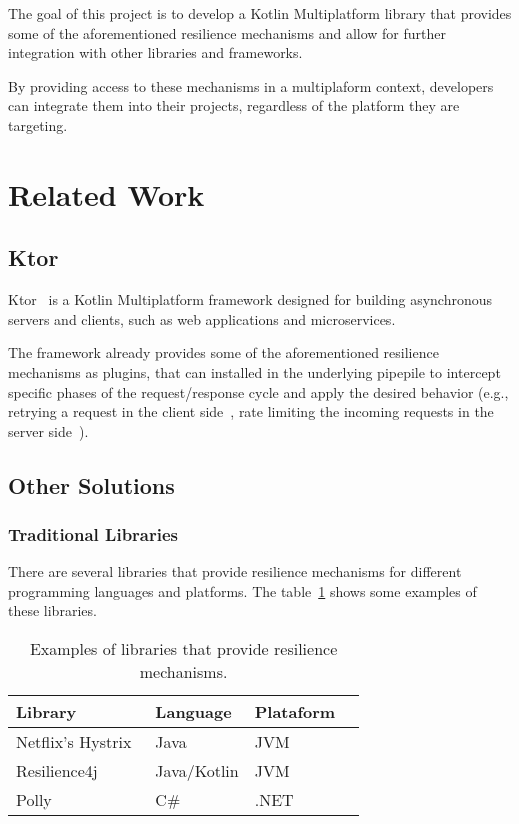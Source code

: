 The goal of this project is to develop a Kotlin Multiplatform library that provides some of the aforementioned resilience mechanisms and allow for further integration with other libraries and frameworks.

By providing access to these mechanisms in a multiplaform context, developers can integrate them into their projects, regardless of the platform they are targeting.


\section{Related Work}\label{sec:related-work}

\subsection{Ktor}\label{subsec:ktor}
Ktor~\cite{ktor} is a Kotlin Multiplatform framework designed for building asynchronous servers and clients, such as web applications and microservices.

The framework already provides some of the aforementioned resilience mechanisms as plugins, that can installed in the underlying pipepile to intercept specific phases of the request/response cycle and apply the desired behavior (e.g., retrying a request in the client side~\cite{ktor-client-retry}, rate limiting the incoming requests in the server side~\cite{ktor-server-rate-limit}).

\subsection{Other Solutions}\label{subsec:other-solutions}

\subsubsection{Traditional Libraries}

There are several libraries that provide resilience mechanisms for different programming languages and platforms.
The table~\ref{tab:resilience_libraries} shows some examples of these libraries.

\begin{table}[h!]
    \centering
    \caption{Examples of libraries that provide resilience mechanisms.}
    \label{tab:resilience_libraries}
    \vspace{0.3cm}
    \begin{tabular}{|l|l|l|l|}
        \hline
        \textbf{Library}                         & \textbf{Language} & \textbf{Plataform} \\ \hline
        Netflix's Hystrix~\cite{netflix-hystrix} & Java              & JVM                \\ \hline
        Resilience4j~\cite{resilience4j}         & Java/Kotlin       & JVM                \\ \hline
        Polly ~\cite{polly-dotnet}               & C\#               & .NET               \\
        \hline
    \end{tabular}
\end{table}

